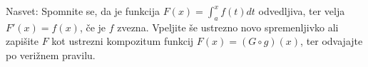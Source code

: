 \documentclass[11pt,a4paper]{exam}
\renewcommand{\{}{\lbrace}
\renewcommand{\}}{\rbrace}
\begin{document}
\begin{questions}
				Nasvet: Spomnite se, da je funkcija $F(x) = \int_{a}^{x} f(t) dt$ odvedljiva, ter velja $F'(x) = f(x)$, če je $f$ zvezna. Vpeljite še ustrezno novo spremenljivko ali zapišite $F$ kot ustrezni kompozitum funkcij $F(x) = (G \circ g)(x)$, ter odvajajte po verižnem pravilu.


\end{questions}

\end{document}
